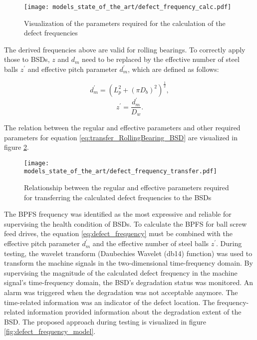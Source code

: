 \begin{figure}[H]
  \centering
  \texttt{[image: models\_state\_of\_the\_art/defect\_frequency\_calc.pdf]}
  \caption{Visualization of the parameters required for the calculation of the defect frequencies \cite{Lee2015}}
  \label{fig:defect_frequency_calc}
\end{figure}

The derived frequencies above are valid for rolling bearings. To correctly apply those to BSDs, $z$ and $d_{m}$ need to be replaced by the effective number of steel balls $z^{'}$ and effective pitch parameter $d_{m}^{'}$, which are defined as follows:

\begin{equation} \label{eq:transfer_RollingBearing_BSD}
    d_{m}^{'} = (L_{p}^{2}+(\pi D_{b})^{2})^{\frac{1}{2}},
\end{equation}
\begin{equation}
    z^{'} = \frac{d_{m}^{'}}{D_{w}}.
\end{equation}

The relation between the regular and effective parameters and other required parameters for equation \ref{eq:transfer_RollingBearing_BSD} are visualized in figure \ref{fig:defect_frequency_transfer}. 

\begin{figure}[H]
  \centering
  \texttt{[image: models\_state\_of\_the\_art/defect\_frequency\_transfer.pdf]}
  \caption{Relationship between the regular and effective parameters required for transferring the calculated defect frequencies to the BSDs \cite{Lee2015}}
  \label{fig:defect_frequency_transfer}
\end{figure}

The BPFS frequency was identified as the most expressive and reliable for supervising the health condition of BSDs. To calculate the BPFS for ball screw feed drives, the equation \ref{eq:defect_frequency} must be combined with the effective pitch parameter $d_{m}^{'}$ and the effective number of steel balls $z^{'}$. During testing, the wavelet transform (Daubechies Wavelet (db14) function) was used to transform the machine signals in the two-dimensional time-frequency domain. By supervising the magnitude of the calculated defect frequency in the machine signal's time-frequency domain, the BSD's degradation status was monitored. An alarm was triggered when the degradation was not acceptable anymore. The time-related information was an indicator of the defect location. The frequency-related information provided information about the degradation extent of the BSD. The proposed approach during testing is visualized in figure \ref{fig:defect_frequency_model}. 


